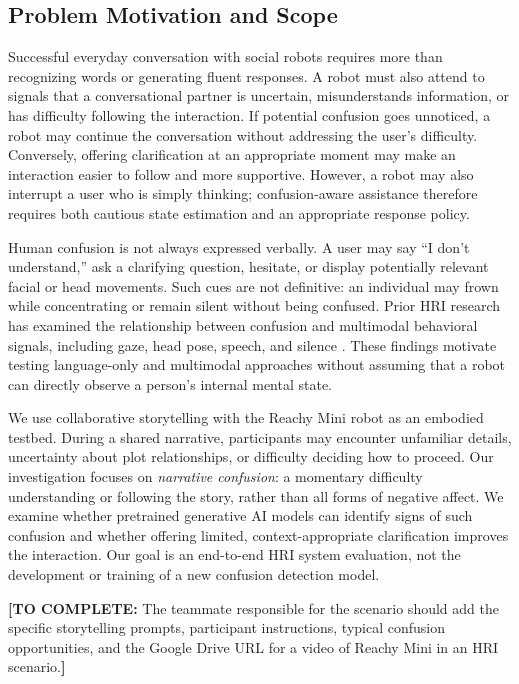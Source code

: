 \documentclass[conference]{IEEEtran}
\newcommand{\drafttodo}[1]{\par\smallskip\noindent\textcolor{red!65!black}{\textbf{[TO COMPLETE:} #1\textbf{]}}\par\smallskip}
\begin{document}
\subsection{Problem Motivation and Scope}
Successful everyday conversation with social robots requires more than recognizing words or generating fluent responses. A robot must also attend to signals that a conversational partner is uncertain, misunderstands information, or has difficulty following the interaction. If potential confusion goes unnoticed, a robot may continue the conversation without addressing the user's difficulty. Conversely, offering clarification at an appropriate moment may make an interaction easier to follow and more supportive. However, a robot may also interrupt a user who is simply thinking; confusion-aware assistance therefore requires both cautious state estimation and an appropriate response policy.

Human confusion is not always expressed verbally. A user may say ``I don't understand,'' ask a clarifying question, hesitate, or display potentially relevant facial or head movements. Such cues are not definitive: an individual may frown while concentrating or remain silent without being confused. Prior HRI research has examined the relationship between confusion and multimodal behavioral signals, including gaze, head pose, speech, and silence \cite{li2023hmm,li2023invoking}. These findings motivate testing language-only and multimodal approaches without assuming that a robot can directly observe a person's internal mental state.

We use collaborative storytelling with the Reachy Mini robot as an embodied testbed. During a shared narrative, participants may encounter unfamiliar details, uncertainty about plot relationships, or difficulty deciding how to proceed. Our investigation focuses on \emph{narrative confusion}: a momentary difficulty understanding or following the story, rather than all forms of negative affect. We examine whether pretrained generative AI models can identify signs of such confusion and whether offering limited, context-appropriate clarification improves the interaction. Our goal is an end-to-end HRI system evaluation, not the development or training of a new confusion detection model.

\drafttodo{The teammate responsible for the scenario should add the specific storytelling prompts, participant instructions, typical confusion opportunities, and the Google Drive URL for a video of Reachy Mini in an HRI scenario.}
\end{document}
